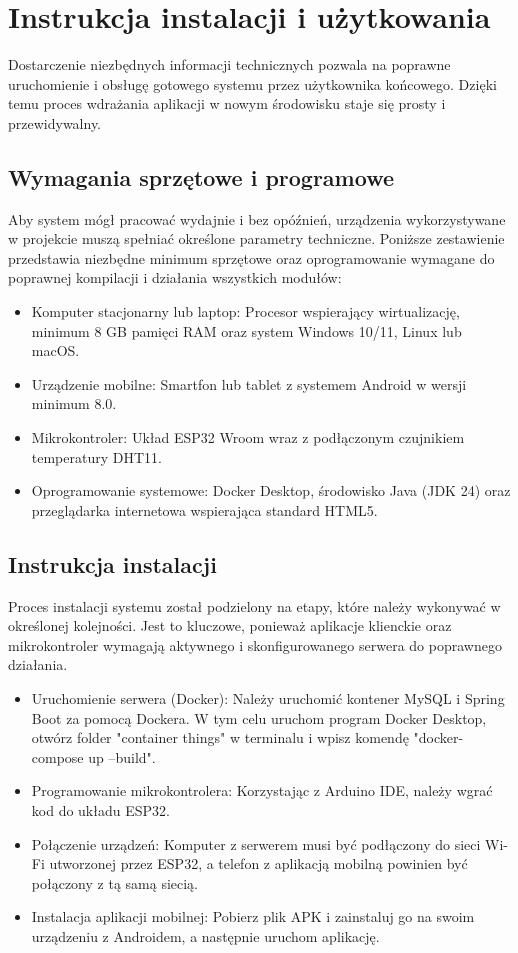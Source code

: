 \chapter{Instrukcja instalacji i użytkowania}
Dostarczenie niezbędnych informacji technicznych pozwala na poprawne uruchomienie i obsługę gotowego systemu przez użytkownika końcowego. Dzięki temu proces wdrażania aplikacji w nowym środowisku staje się prosty i przewidywalny.

\section{Wymagania sprzętowe i programowe}
Aby system mógł pracować wydajnie i bez opóźnień, urządzenia wykorzystywane \\ w projekcie muszą spełniać określone parametry techniczne. Poniższe zestawienie przedstawia niezbędne minimum sprzętowe oraz oprogramowanie wymagane do poprawnej kompilacji i działania wszystkich modułów:
\begin{itemize}
	\item Komputer stacjonarny lub laptop: Procesor wspierający wirtualizację, minimum 8 GB pamięci RAM oraz system Windows 10/11, Linux lub macOS.
	\item Urządzenie mobilne: Smartfon lub tablet z systemem Android w wersji minimum 8.0.
	\item Mikrokontroler: Układ ESP32 Wroom wraz z podłączonym czujnikiem temperatury DHT11.
	\item Oprogramowanie systemowe: Docker Desktop, środowisko Java (JDK 24) oraz przeglądarka internetowa wspierająca standard HTML5.
\end{itemize}
\section{Instrukcja instalacji}
Proces instalacji systemu został podzielony na etapy, które należy wykonywać w określonej kolejności. Jest to kluczowe, ponieważ aplikacje klienckie oraz mikrokontroler wymagają aktywnego i skonfigurowanego serwera do poprawnego działania.
\begin{itemize}
	\item Uruchomienie serwera (Docker): Należy uruchomić kontener MySQL i Spring Boot za pomocą Dockera. W tym celu uruchom program Docker Desktop, otwórz folder "container things" w terminalu i wpisz komendę "docker-compose up --build".
	\item Programowanie mikrokontrolera: Korzystając z Arduino IDE, należy wgrać kod do układu ESP32.
	\item Połączenie urządzeń: Komputer z serwerem musi być podłączony do sieci Wi-Fi utworzonej przez ESP32, a telefon z aplikacją mobilną powinien być połączony z tą samą siecią.
	\item Instalacja aplikacji mobilnej: Pobierz plik APK i zainstaluj go na swoim urządzeniu z Androidem, a następnie uruchom aplikację.
\end{itemize}

